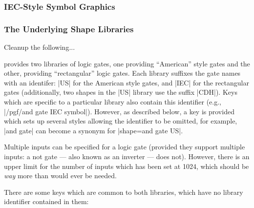 \subsubsection{IEC-Style Symbol Graphics}

\subsubsection{The Underlying Shape Libraries}


Cleanup the following...

\pgfname{} provides two libraries of logic gates, one providing
``American'' style gates and the other, providing ``rectangular'' 
logic gates.	
Each library suffixes the gate names with an identifer:
|US| for the American style gates, and |IEC| for the rectangular
gates (additionally, two shapes in the |US| library use the
suffix |CDH|). Keys which are specific
to a particular library	also contain this identifier (e.g., 
|/pgf/and gate IEC symbol|).
However, as described below, a \tikzname{} key is provided which
sets up several styles allowing the identifier to be omitted,
for example, |and gate| can become a synonym for |shape=and gate US|.

Multiple inputs can be specified for a logic gate (provided they
support multiple inputs: a not gate --- also known as an inverter ---
does not). However, there is an upper limit for the number of inputs 
which has been set at 1024, which should be \emph{way} 
more than would ever be needed.

There are some \pgfname{} keys which are common to both 
libraries, which have no library identifier contained in them:
 
